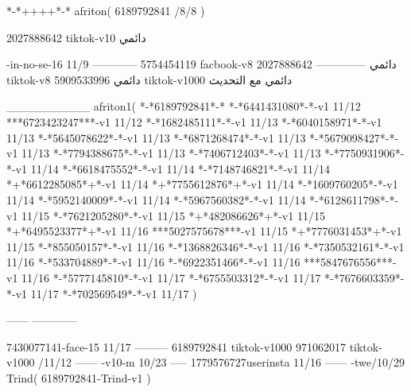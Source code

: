 *-*++++*-*
afriton(
6189792841 /8/8
)

2027888642 tiktok-v10
دائمي

-in-no-se-16 11/9
------------
5754454119 facbook-v8
دائمي
--------------
2027888642 tiktok-v8
دائمي
5909533996 tiktok-v1000
دائمي مع التحديث

__________
afriton1(
*-*6189792841*-*
*-*6441431080*-*-v1 11/12
***6723423247***-v1 11/12
*-*1682485111*-*-v1 11/13
*-*6040158971*-*-v1 11/13
*-*5645078622*-*-v1 11/13
*-*6871268474*-*-v1 11/13
*-*5679098427*-*-v1 11/13
*-*7794388675*-*-v1 11/13
*-*7406712403*-*-v1 11/13
*-*7750931906*-*-v1 11/14
*-*6618475552*-*-v1 11/14
*-*7148746821*-*-v1 11/14
*+*6612285085*+*-v1 11/14
*+*7755612876*+*-v1 11/14
*-*1609760205*-*-v1 11/14
*-*5952140009*-*-v1 11/14
*-*5967560382*-*-v1 11/14
*-*6128611798*-*-v1 11/15
*-*7621205280*-*-v1 11/15
*+*482086626*+*-v1 11/15
*+*6495523377*+*-v1 11/16
***5027575678***-v1 11/15
*+*7776031453*+*-v1 11/15
*-*855050157*-*-v1 11/16
*-*1368826346*-*-v1 11/16
*-*7350532161*-*-v1 11/16
*-*533704889*-*-v1 11/16
*-*6922351466*-*-v1 11/16
***5847676556***-v1 11/16
*-*5777145810*-*-v1 11/17
*-*6755503312*-*-v1 11/17
*-*7676603359*-*-v1 11/17
*-*702569549*-*-v1 11/17
)

------
------------

7430077141-face-15 11/17
---------
6189792841 tiktok-v1000
971062017 tiktok-v1000 /11/12
------
-v10-m 10/23
-----
1779576727userinsta 11/16
------
-twe/10/29
Trind(
6189792841-Trind-v1 
)
